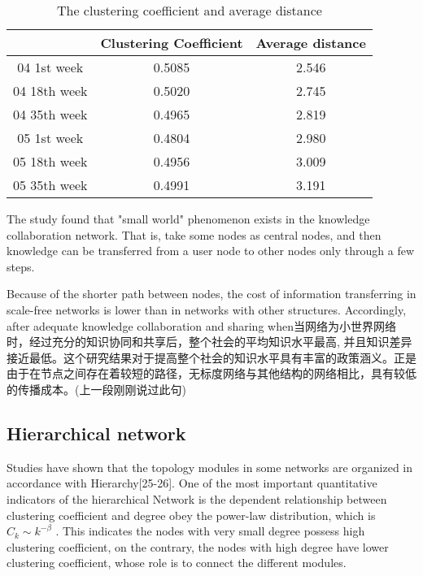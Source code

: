 \documentclass{elsarticle}
\begin{document}
\begin{table}[htpb]
  \centering
 \caption{The clustering coefficient and average distance} 
 \begin{tabular}{|c|c|c|}
    &Clustering Coefficient&Average distance\\\hline
  04 1st week&0.5085&2.546\\\hline
  04 18th week&0.5020&2.745\\\hline
  04 35th week&0.4965&2.819\\\hline
  05 1st week&0.4804&2.980\\\hline
  05 18th week&0.4956&3.009\\\hline
  05 35th week&0.4991&3.191\\\hline
   \end{tabular}
 
\end{table}
The study found that "small world" phenomenon exists in the knowledge
collaboration network. That is, take some nodes as central nodes, and
then knowledge can be transferred from a user node to other nodes only
through a few steps.

Because of the shorter path between nodes, the cost of information transferring in scale-free networks is lower than in networks with other structures. Accordingly, after adequate knowledge collaboration and sharing when当网络为小世界网络时，经过充分的知识协同和共享后，整个社会的平均知识水平最高, 并且知识差异接近最低。这个研究结果对于提高整个社会的知识水平具有丰富的政策涵义。正是由于在节点之间存在着较短的路径，无标度网络与其他结构的网络相比，具有较低的传播成本。(上一段刚刚说过此句)

\subsection{Hierarchical network}
\label{sec:hierarchical-network}

Studies have shown that the topology modules in some networks are
organized in accordance with Hierarchy[25-26]. One of the most
important quantitative indicators of the hierarchical Network is the
dependent relationship between clustering coefficient and degree obey
the power-law distribution, which is $C_k\sim k^{-\beta}$  . This indicates the nodes with very small degree possess high clustering coefficient, on the contrary, the nodes with high degree have lower clustering coefficient, whose role is to connect the different modules.
\end{document}
